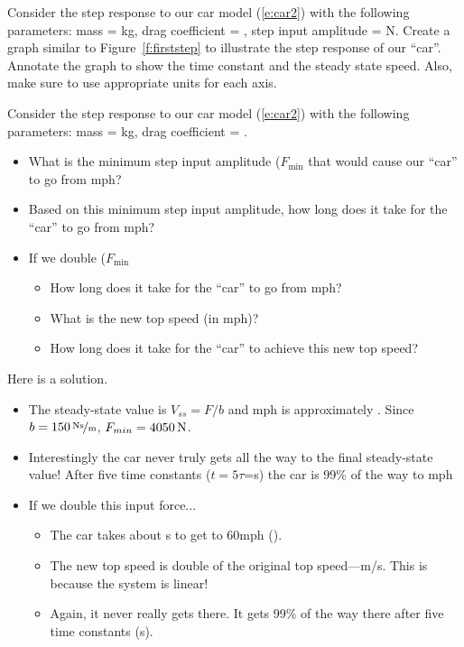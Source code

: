\begin{ex}
Consider the step response to our car model (\ref{e:car2}) with the following parameters: mass = \unit[750]{kg}, drag coefficient = , step input amplitude = \unit[10,000]{N}.  Create a graph similar to Figure~\ref{f:firststep} to illustrate the step response of our ``car''.  Annotate the graph to show the time constant and the steady state speed.  Also, make sure to use appropriate units for each axis.
\end{ex}

\begin{ex}
Consider the step response to our car model (\ref{e:car2}) with the following parameters: mass = \unit[750]{kg}, drag coefficient = .
\begin{itemize}
\item What is the minimum step input amplitude ($F_{\mathrm{min}}$ that would cause our ``car'' to go from \unit[0--60]{mph}?
\item Based on this minimum step input amplitude, how long does it take for the ``car'' to go from \unit[0--60]{mph}?
\item If we double ($F_{\mathrm{min}}$
 \begin{itemize}
 \item How long does it take for the ``car'' to go from \unit[0--60]{mph}?
 \item What is the new top speed (in mph)?
 \item How long does it take for the ``car'' to achieve this new top speed?
 \end{itemize}
\end{itemize}
\end{ex}

\ifsolutions
\begin{soln}
Here is a solution.
\begin{itemize}
\item The steady-state value is $V_{ss}=F/b$ and \unit[60]{mph} is approximately .  Since $b=\unitfrac[150]{Ns}{m}$, $F_{min}=\unit[4050]{N}$.
\item Interestingly the car never truly gets all the way to the final steady-state value!  After five time constants ($t=5\tau$=\unit[25]{s}) the car is 99\% of the way to \unit[60]{mph}
\item If we double this input force...
\begin{itemize}
\item The car takes about \unit[4]{s} to get to \unit{60}{mph} ().
\item The new top speed is double of the original top speed---\unit[120]{m/s}.  This is because the system is linear!
\item Again, it never really gets there.  It gets 99\% of the way there after five time constants (\unit[25]{s}).
\end{itemize}
\end{itemize}
\end{soln}
\fi

